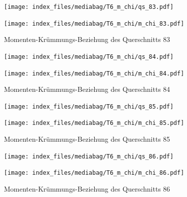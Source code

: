 \documentclass[
  11pt,
  letterpaper,
]{scrreprt}
\begin{document}
\begin{figure}[H]

\begin{minipage}{0.50\linewidth}
\texttt{[image: index\_files/mediabag/T6\_m\_chi/qs\_83.pdf]}\end{minipage}%
%
\begin{minipage}{0.50\linewidth}
\texttt{[image: index\_files/mediabag/T6\_m\_chi/m\_chi\_83.pdf]}\end{minipage}%

\caption{\label{fig-m_chi_appendix}Momenten-Krümmungs-Beziehung des
Querschnitts 83}

\end{figure}%

\begin{figure}[H]

\begin{minipage}{0.50\linewidth}
\texttt{[image: index\_files/mediabag/T6\_m\_chi/qs\_84.pdf]}\end{minipage}%
%
\begin{minipage}{0.50\linewidth}
\texttt{[image: index\_files/mediabag/T6\_m\_chi/m\_chi\_84.pdf]}\end{minipage}%

\caption{\label{fig-m_chi_appendix}Momenten-Krümmungs-Beziehung des
Querschnitts 84}

\end{figure}%

\begin{figure}[H]

\begin{minipage}{0.50\linewidth}
\texttt{[image: index\_files/mediabag/T6\_m\_chi/qs\_85.pdf]}\end{minipage}%
%
\begin{minipage}{0.50\linewidth}
\texttt{[image: index\_files/mediabag/T6\_m\_chi/m\_chi\_85.pdf]}\end{minipage}%

\caption{\label{fig-m_chi_appendix}Momenten-Krümmungs-Beziehung des
Querschnitts 85}

\end{figure}%

\begin{figure}[H]

\begin{minipage}{0.50\linewidth}
\texttt{[image: index\_files/mediabag/T6\_m\_chi/qs\_86.pdf]}\end{minipage}%
%
\begin{minipage}{0.50\linewidth}
\texttt{[image: index\_files/mediabag/T6\_m\_chi/m\_chi\_86.pdf]}\end{minipage}%

\caption{\label{fig-m_chi_appendix}Momenten-Krümmungs-Beziehung des
Querschnitts 86}

\end{figure}%
\end{document}
